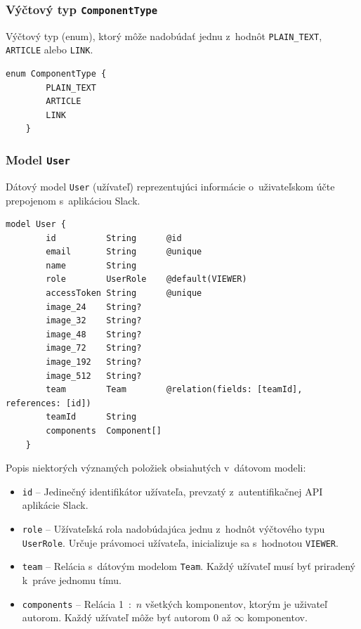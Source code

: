 \subsubsection{Výčtový typ \texttt{ComponentType}}
Výčtový typ (enum), ktorý môže nadobúdať jednu z~hodnôt \texttt{PLAIN\_TEXT}, \texttt{ARTICLE} alebo \texttt{LINK}. \\

\begin{lstlisting}[caption=Výčtový typ \texttt{ComponentType} v~konfiguračnom súbore \texttt{prisma}.]
	enum ComponentType {
		PLAIN_TEXT
		ARTICLE
		LINK
	}
\end{lstlisting}

\subsubsection{Model \texttt{User}}
Dátový model \texttt{User} (užívateľ) reprezentujúci informácie o~uživateľskom účte prepojenom s~aplikáciou Slack. \\

\begin{lstlisting}[caption=Dátový model \texttt{User} v~konfiguračnom súbore \texttt{prisma}.]
	model User {
		id          String      @id
		email       String      @unique
		name        String
		role        UserRole    @default(VIEWER)
		accessToken String      @unique
		image_24    String?
		image_32    String?
		image_48    String?
		image_72    String?
		image_192   String?
		image_512   String?
		team        Team        @relation(fields: [teamId], references: [id])
		teamId      String
		components  Component[]
	}
\end{lstlisting}

\medskip

\noindent Popis niektorých významých položiek obsiahutých v~dátovom modeli:

\begin{itemize}
	\item \texttt{id} -- Jedinečný identifikátor užívateľa, prevzatý z~autentifikačnej API aplikácie Slack.
	\item \texttt{role} -- Užívateľská rola nadobúdajúca jednu z~hodnôt výčtového typu \texttt{UserRole}. Určuje právomoci užívateľa, inicializuje sa s~hodnotou \texttt{VIEWER}.
	\item \texttt{team} -- Relácia s~dátovým modelom \texttt{Team}. Každý užívateľ musí byť priradený k~práve jednomu tímu.
	\item \texttt{components} -- Relácia 1~:~$n$ všetkých komponentov, ktorým je uživateľ autorom. Každý užívateľ môže byť autorom 0 až $\infty$ komponentov.
\end{itemize}

